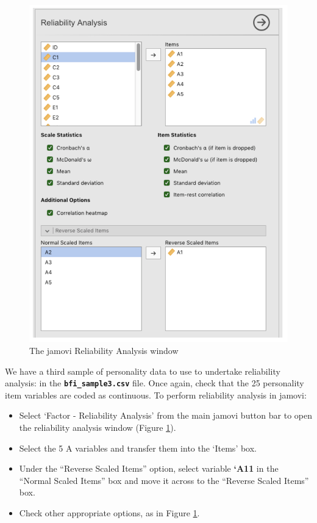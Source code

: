 \documentclass[
]{book}
\providecommand{\tightlist}{%
  \setlength{\itemsep}{0pt}\setlength{\parskip}{0pt}}
\begin{document}
\begin{figure}

{\centering \includegraphics[width=1\linewidth]{img/factoranalysis/rel1} 

}

\caption{The jamovi Reliability Analysis window}\label{fig:rel1}
\end{figure}

We have a third sample of personality data to use to undertake reliability analysis: in the \textbf{\texttt{bfi\_sample3.csv}} file. Once again, check that the 25 personality item variables are coded as continuous. To perform reliability analysis in jamovi:

\begin{itemize}
\tightlist
\item
  Select `Factor - Reliability Analysis' from the main jamovi button bar to open the reliability analysis window (Figure \ref{fig:rel1}).
\item
  Select the 5 A variables and transfer them into the `Items' box.
\item
  Under the ``Reverse Scaled Items'' option, select variable \textbf{`A11} in the ``Normal Scaled Items'' box and move it across to the ``Reverse Scaled Items'' box.
\item
  Check other appropriate options, as in Figure \ref{fig:rel1}.
\end{itemize}
\end{document}
